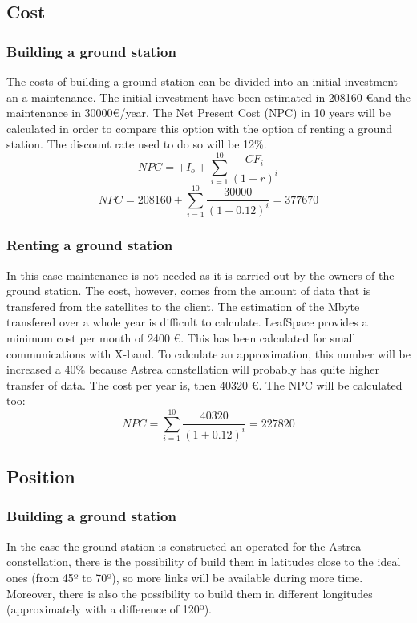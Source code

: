 \subsection{Cost}
\subsubsection{Building a ground station}
The costs of building a ground station can be divided into an initial investment an a maintenance. The initial investment have been estimated in 208160 \euro and the maintenance in 30000\euro /year. The Net Present Cost (NPC) in 10 years will be calculated in order to compare this option with the option of renting a ground station. The discount rate used to do so will be 12\%.
\begin{equation}
NPC=+I_{o}+\sum_{i=1}^{10} \frac{CF_{i}}{(1+r)^i}
\end{equation}
\begin{equation}
NPC=208160+\sum_{i=1}^{10} \frac{30000}{(1+0.12)^i}=377670
\end{equation}
\subsubsection{Renting a ground station}
In this case maintenance is not needed as it is carried out by the owners of the ground station. The cost, however, comes from the amount of data that is transfered from the satellites to the client. The estimation of the Mbyte transfered over a whole year is difficult to calculate. LeafSpace provides a minimum cost per month of 2400 \euro . This has been calculated for small communications  with X-band. To calculate an approximation, this number will be increased a 40\% because Astrea constellation will probably has quite higher transfer of data. The cost per year is, then 40320 \euro. The NPC will be calculated too: 
 \begin{equation}
NPC=\sum_{i=1}^{10} \frac{40320}{(1+0.12)^i}=227820 
\end{equation}
\subsection{Position}
\subsubsection{Building a ground station}
In the case the ground station is constructed an operated for the Astrea constellation, there is the possibility of build them in latitudes close to the ideal ones (from 45º to 70º), so more links will be available during more time. Moreover, there is also the possibility to build them in different longitudes (approximately with a difference of 120º). 
